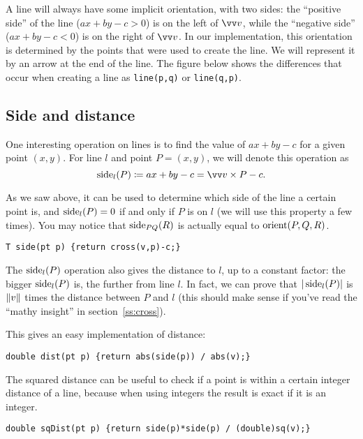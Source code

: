 A line will always have some implicit orientation, with two sides: the ``positive side'' of the line ($ax+by-c > 0$) is on the left of $\dir$, while the ``negative side'' ($ax+by-c < 0$) is on the right of $\dir$.
In our implementation, this orientation is determined by the points that were used to create the line.
We will represent it by an arrow at the end of the line. The figure below shows the differences that occur when creating a line as \lstinline|line(p,q)| or \lstinline|line(q,p)|.


\subsection{Side and distance}\label{ss:side-dist}
One interesting operation on lines is to find the value of $ax+by-c$ for a given point $(x,y)$. For line $l$ and point $P=(x,y)$, we will denote this operation as
\[\side_l(P) \coloneqq ax+by-c = \dir \times P - c.\]

As we saw above, it can be used to determine which side of the line a certain point is, and $\operatorname{side}_l(P) = 0$ if and only if $P$ is on $l$ (we will use this property a few times). You may notice that $\operatorname{side}_{PQ}(R)$ is actually equal to $\operatorname{orient}(P,Q,R)$.


\begin{lstlisting}
T side(pt p) {return cross(v,p)-c;}
\end{lstlisting}

The $\operatorname{side}_l(P)$ operation also gives the distance to $l$, up to a constant factor: the bigger $\operatorname{side}_l(P)$ is, the further from line $l$. In fact, we can prove that $|\operatorname{side}_l(P)|$ is $\lVert v\rVert$ times the distance between $P$ and $l$ (this should make sense if you've read the ``mathy insight'' in section~\ref{ss:cross}).


This gives an easy implementation of distance:
\begin{lstlisting}
double dist(pt p) {return abs(side(p)) / abs(v);}
\end{lstlisting}
The squared distance can be useful to check if a point is within a certain integer distance of a line, because when using integers the result is exact if it is an integer.
\begin{lstlisting}
double sqDist(pt p) {return side(p)*side(p) / (double)sq(v);}
\end{lstlisting}

